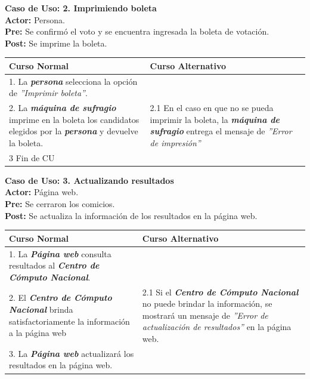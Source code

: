 \documentclass[spanish, 10pt,a4paper]{article}
\numberwithin{equation}{section} %
\begin{document}
\newpage
\noindent\textbf{Caso de Uso: 2. Imprimiendo boleta}\\
\textbf{Actor: } Persona.\\
\textbf{Pre: } Se confirmó el voto y se encuentra ingresada la boleta de votación.\\
\textbf{Post: } Se imprime la boleta.\\
\begin{table}[H]
  \centering
\bgroup
\def\arraystretch{1.3}
  \begin{tabular}{p{9cm} | p{7cm}}
    \hline
    Curso Normal & Curso Alternativo \\
    \hline
    \hline    
    1. La \textbf{\textit{persona}} selecciona la opción de \textit{''Imprimir boleta''}. 
    & \\
    
    \hline
    2. La \textbf{\textit{máquina de sufragio}} imprime en la boleta los candidatos elegidos por la \textbf{\textit{persona}} y devuelve la boleta.
    &
    2.1 En el caso en que no se pueda imprimir la boleta, la \textbf{\textit{máquina de sufragio}} entrega el mensaje de \textit{''Error de impresión''}
    \\
    
    \hline
    3 Fin de CU
    & \\
    \hline
  \end{tabular}
\egroup
\end{table}


\noindent\textbf{Caso de Uso: 3. Actualizando resultados}\\
\textbf{Actor: } Página web.\\
\textbf{Pre: } Se cerraron los comicios.\\
\textbf{Post: } Se actualiza la información de los resultados en la página web.\\
\begin{table}[H]
  \centering
  \begin{tabular}{p{9cm} | p{7cm}}
    \hline
    Curso Normal & Curso Alternativo \\
    \hline
    \hline    
    1. La \textbf{\textit{Página web}} consulta resultados al \textbf{\textit{Centro de Cómputo Nacional}}. 
    & \\
    
    \hline
    2. El \textbf{\textit{Centro de Cómputo Nacional}} brinda satisfactoriamente la información a la página web
    & 
    2.1 Si el \textbf{\textit{Centro de Cómputo Nacional}} no puede brindar la información, se mostrará un mensaje de \textit{''Error de actualización de resultados''} en la página web.
    \\
    
    \hline
    3. La \textbf{\textit{Página web}} actualizará los resultados en la página web.
    & \\
    \hline
  \end{tabular}
\end{table}
\end{document}
